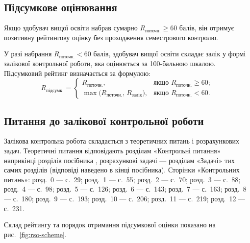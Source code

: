 \documentclass{Syllabus}
\begin{document}
\subsection*{Підсумкове оцінювання}

\noindent Якщо здобувач вищої освіти набрав сумарно $R_{\text{поточн.}} \ge 60$ балів, він отримує позитивну рейтингову оцінку без проходження семестрового контролю.

У разі набрання $R_{\text{поточн.}} < 60$ балів, здобувач вищої освіти складає залік у формі залікової контрольної роботи, яка оцінюється за 100-бальною шкалою.
Підсумковий рейтинг визначається за формулою:
\begin{equation*}
R_\text{підсумк.} =
\begin{cases}
R_\text{поточн.}, & \text{якщо } R_\text{поточн.} \ge 60; \\[6pt]
\max\bigl(R_\text{поточн.},\,R_\text{залік}\bigr), & \text{якщо } R_\text{поточн.} < 60.
\end{cases}
\end{equation*}

\subsection*{Питання до залікової контрольної роботи}

Залікова контрольна робота складається з теоретичних питань і розрахункових задач. Теоретичні питання відповідають розділам «Контрольні питання» наприкінці розділів посібника \cite{ponomarenko2026plasma}, розрахункові задачі --- розділам «Задачі» тих самих розділів (відповіді наведено в кінці посібника). Сторінки «Контрольних питань»: 
розд.~0 --- с.~29; розд.~1 --- с.~55; розд.~2 --- с.~70; розд.~3 --- с.~88; розд.~4 --- с.~98; розд.~5 --- с.~126; розд.~6 --- с.~143; розд.~7 --- с.~163; розд.~8 --- с.~180; розд.~9 --- с.~193; розд.~10 --- с.~206; розд.~11 --- с.~219; розд.~12 --- с.~231.

Склад рейтингу та порядок отримання підсумкової оцінки показано на рис.~\ref{fig:rso-scheme}.
\end{document}

